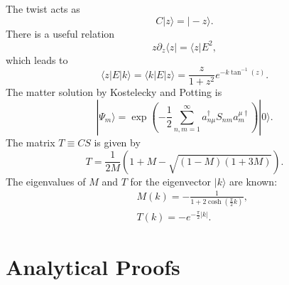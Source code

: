 \documentclass[a4paper,12pt]{article}
\begin{document}
The twist acts as
\begin{equation}
C|z\rangle=|-z\rangle.
\end{equation}
There is a useful relation
\begin{equation}\label{zdz}
z\partial_z\langle z|=\langle z |E^2,
\end{equation}
which leads to
\begin{equation}\label{zEk}
\langle z|E|k\rangle=\langle k|E|z\rangle=\frac{z}{1+z^2}e^{-k\tan^{-1}(z)}.
\end{equation}
The matter solution by Kostelecky and Potting is \cite{Kostelecky-Potting}
\begin{equation}
|\Psi_m \rangle = \exp\left (-\frac{1}{2}\sum_{n,m=1}^{\infty}
a_{n\mu}^{\dagger} S_{nm} a_{m}^{\mu\dagger} \right)|0\rangle.
\end{equation}
The matrix $T\equiv CS$ is given by \cite{Kostelecky-Potting}
\begin{equation}
T=\frac{1}{2M}\left(1+M-\sqrt{(1-M)(1+3M)}\right).
\end{equation}
The eigenvalues of $M$ and $T$ for the eigenvector $|k\rangle$ are known:
\begin{eqnarray}
&&M(k)=-\frac{1}{1+2\cosh(\frac{\pi}{2}k)},\label{M(k)}\\
&&T(k)=-e^{-\frac{\pi}{2}|k|}.\label{T(k)}
\end{eqnarray}

\section{Analytical Proofs}\label{proof}
\setcounter{equation}{0}
\end{document}
